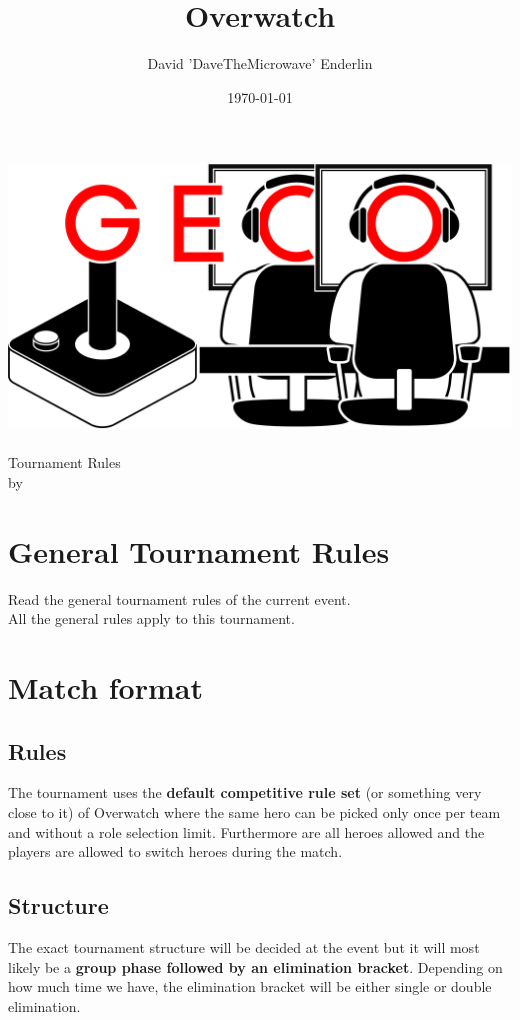 \documentclass{article}
\title{Overwatch}
\author{David 'DaveTheMicrowave' Enderlin}
\date{\today}
\begin{document}
	
	\makeatletter
	\begin{titlepage}
		\centering
		\includegraphics[scale=0.075]{../img/GECo.png}\\
		\LARGE \@title\\ Tournament Rules\\ \normalsize by \@author\\ \@date
	\end{titlepage}
	\makeatother
	
	\clearpage
	
	\tableofcontents
	\clearpage
	
	\section{General Tournament Rules}
	Read the general tournament rules of the current event.\\
	All the general rules apply to this tournament.
	
	\section{Match format}
	\subsection{Rules}
	The tournament uses the \textbf{default competitive rule set} (or something very close to it) of Overwatch where the same hero can be picked only once per team and without a role selection limit. Furthermore are all heroes allowed and the players are allowed to switch heroes during the match.
	
	\subsection{Structure}
	The exact tournament structure will be decided at the event but it will most likely be a \textbf{group phase followed by an elimination bracket}. Depending on how much time we have, the elimination bracket will be either single or double elimination.
	
\end{document}
